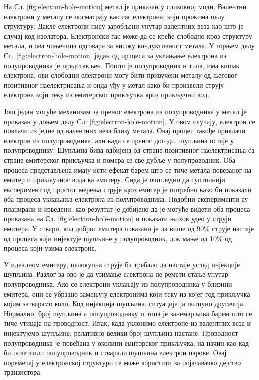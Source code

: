 \documentclass{article}
\begin{document}
На Сл. \ref{fig:electron-hole-motion} метал је приказан у сликовној моди. Валентни електрони у металу се посматрају као гас електрона, који прожима целу структуру. Дакле електрони нису заробљени унутар валентних веза као што је случај код изолатора. Електронски гас може да се креће слободно кроз структуру метала, и ова чињеница одговара за високу кондуктивност метала. У горњем делу Сл. \ref{fig:electron-hole-motion} један од процеса за уклањање електрона из полупроводника је представљен. Пошто је полупроводник н типа, има вишак електрона, ови слободни електрони могу бити привучени металу од његовог позитивног наелектрисања и онда уђу у метал како би произвели струју електрона који теку из емитерског прикључка кроз прикључни вод.

Још један могуће механизам за пренос електрона из полупроводника у метал је приказан у доњем делу Сл. \ref{fig:electron-hole-motion}. У овом случају, електрон се повлачи из једне од валентних веза  близу метала. Овај процес такође привлачи електрон из полупроводника, али када се пренос догоди, шупљина остаје у полупроводнику. Шупљина бива одбијена од стране позитивног наелектрисања са стране емитерског прикључка и помера се све дубље у полупроводник. Оба процеса представљена имају исти ефекат барем што се тиче метала повезаног на емитер и прикључног вода ка емитеру. Онда је очигледно да суптилнији експеримент од простог мерења струје кроз емитер је потребно како би показали оба процеса уклањања електрона из полупроводника. Подобни експерименти су планирани и изведени. као резултат је добијено да је могуће видети оба процеса приказана на Сл. \ref{fig:electron-hole-motion} и показати њихов удео у струји емитера. У ствари, код доброг емитера показано је да више од 90\% струје настаје од процеса који инјектује шупљине у полупроводник, док мање од 10\% од процеса који узима електроне.

У идеалном емитеру, целокупна струје би требало да настаје услед инјекције шупљина. Разлог за ово је да узимање електрона не ремети стање унутар полупроводника. Ако се електрони уклањају из полупроводника у близини емитера, они се  убрзано замењују електронима који теку из којег год прикључка којим затварамо коло. Код инјекција шупљина, ситуација ја потпуно другачија. Нормално, број шупљина а полупроводнику $n$ типа је занемарљива барем што се тиче утицаја на проводност. Ипак, када уклонимо електроне из валентних веза и инјектујемо шупљине, релативно велики број шупљина настане. Проводност полупроводника је повећана у околини емиторског прикључка, на начин као кад би осветлили полупроводник и стварали шупљина електрон парове. Овај поремећај у електронској структури се може користити за појачавачко дејство транзистора.
\end{document}
